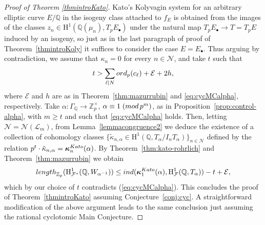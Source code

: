 \documentclass[10pt,reqno]{amsart}
\numberwithin{equation}{section}
\theoremstyle{plain}
\theoremstyle{definition}
\theoremstyle{definition}
\theoremstyle{plain}
\theoremstyle{plain}
\theoremstyle{plain}
\theoremstyle{plain}
\theoremstyle{plain}
\theoremstyle{plain}
\newcommand{\Z}{\mathbb{Z}}
\newcommand{\Q}{\mathbb{Q}}
\newcommand{\Zp}{\mathbb{Z}_{p}}
\newcommand{\bkappa}{\boldsymbol{\kappa}}
\newcommand{\Fcal}{\mathcal{F}}
\newcommand{\rH}{\mathrm{H}}
\begin{document}
\begin{proof}[Proof of Theorem \ref{thmintroKato}] 

Kato's Kolyvagin system for an arbitrary elliptic curve $E/\Q$ in the isogeny class attached to $f_E$ is obtained from the images of the classes $z_n\in\rH^1(\Q(\mu_n),T_pE_\bullet)$ under the natural map $T_pE_\bullet\rightarrow T=T_pE$ induced by an isogeny, so just as in the last paragraph of proof of Theorem~\ref{thmintroKoly} it suffices to consider the case $E=E_\bullet$. Thus arguing by contradiction, we assume that $\kappa_n=0$ for every $n\in\mathcal{N}$, and take $t$ such that
\[
t>\sum_{\ell\mid N}{\rm ord}_p(c_\ell)+\mathcal{E}+2h,
\]
where $\mathcal{E}$ and $h$ are as in Theorem~\ref{thm:mazurrubin} and \eqref{eq:cycMCalpha}, respectively. Take $\alpha:\Gamma_\Q\rightarrow\Z_p^\times$, $\alpha\equiv 1\;({\rm mod}\,p^m)$, as in Proposition~\ref{prop:control-alpha}, with $m\geq t$
and such that \eqref{eq:cycMCalpha} holds. Then, letting $\mathcal{N}=\mathcal{N}(\mathcal{L}_m)$, from Lemma~\ref{lemmacongruence2} we deduce the existence of a collection of cohomology classes $\{\tilde{\kappa}_{n,\alpha}\in\rH^1(\Q,T_\alpha/I_nT_\alpha)\}_{n\in\mathcal{N}}$ defined by the relation $p^t\cdot\tilde{\kappa}_{n,\alpha}=\bkappa_{n}^{\rm Kato}(\alpha)$. By Theorem~\ref{thm:kato-rohrlich} and Theorem~\ref{thm:mazurrubin} we obtain
\[
{\rm length}_{\Zp}(\rH^1_{\Fcal^*}(\Q,W_{\alpha^{-1}}))\leq{\rm ind}(\bkappa^{\rm Kato}_{1}(\alpha),\rH^1_{\Fcal}(\Q,T_\alpha))-t+\mathcal{E},
\] 
which by our choice of $t$ contradicts (\ref{eq:cycMCalpha}). This concludes the proof of Theorem~\ref{thmintroKato} assuming Conjecture~\ref{conj:cyc}. A straightforward modification of the above argument leads to the same conclusion just assuming the rational cyclotomic Main Conjecture.
\end{proof}

 
\end{document}
